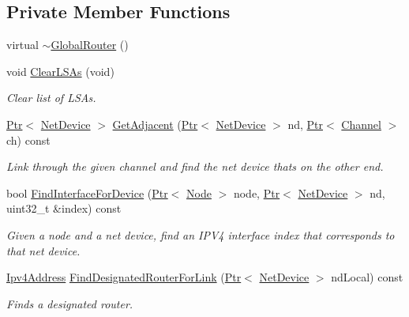\subsection*{Private Member Functions}
\begin{DoxyCompactItemize}
\item 
virtual \hyperlink{classns3_1_1GlobalRouter_a790cbb0b727677916583a16cdd5d177a}{$\sim$\+Global\+Router} ()
\item 
void \hyperlink{classns3_1_1GlobalRouter_a7c6430b2da06fff5ce1fda4ac90c4836}{Clear\+L\+S\+As} (void)
\begin{DoxyCompactList}\small\item\em Clear list of L\+S\+As. \end{DoxyCompactList}\item 
\hyperlink{classns3_1_1Ptr}{Ptr}$<$ \hyperlink{classns3_1_1NetDevice}{Net\+Device} $>$ \hyperlink{classns3_1_1GlobalRouter_a347a9eb0edc5b923d6d3a3614e48769f}{Get\+Adjacent} (\hyperlink{classns3_1_1Ptr}{Ptr}$<$ \hyperlink{classns3_1_1NetDevice}{Net\+Device} $>$ nd, \hyperlink{classns3_1_1Ptr}{Ptr}$<$ \hyperlink{classns3_1_1Channel}{Channel} $>$ ch) const 
\begin{DoxyCompactList}\small\item\em Link through the given channel and find the net device that\textquotesingle{}s on the other end. \end{DoxyCompactList}\item 
bool \hyperlink{classns3_1_1GlobalRouter_a7b30c3c09f93e3f3ac7cfe787b51d127}{Find\+Interface\+For\+Device} (\hyperlink{classns3_1_1Ptr}{Ptr}$<$ \hyperlink{classns3_1_1Node}{Node} $>$ node, \hyperlink{classns3_1_1Ptr}{Ptr}$<$ \hyperlink{classns3_1_1NetDevice}{Net\+Device} $>$ nd, uint32\+\_\+t \&index) const 
\begin{DoxyCompactList}\small\item\em Given a node and a net device, find an I\+P\+V4 interface index that corresponds to that net device. \end{DoxyCompactList}\item 
\hyperlink{classns3_1_1Ipv4Address}{Ipv4\+Address} \hyperlink{classns3_1_1GlobalRouter_ab562e4407394674ef8502b3ab1d051d6}{Find\+Designated\+Router\+For\+Link} (\hyperlink{classns3_1_1Ptr}{Ptr}$<$ \hyperlink{classns3_1_1NetDevice}{Net\+Device} $>$ nd\+Local) const 
\begin{DoxyCompactList}\small\item\em Finds a designated router. \end{DoxyCompactList}\item 

\end{DoxyCompactItemize}
